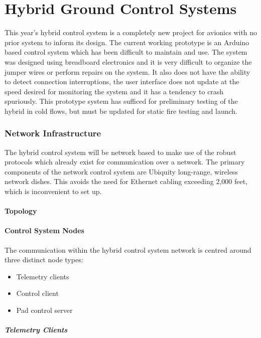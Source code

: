 \part{Hybrid Ground Control Systems}

This year's hybrid control system is a completely new project for avionics with no prior system to inform its design.
The current working prototype is an Arduino based control system which has been difficult to maintain and use. The
system was designed using breadboard electronics and it is very difficult to organize the jumper wires or perform
repairs on the system. It also does not have the ability to detect connection interruptions, the user interface does
not update at the speed desired for monitoring the system and it has a tendency to crash spuriously. This prototype
system has sufficed for preliminary testing of the hybrid in cold flows, but must be updated for static fire testing
and launch.

\section{Network Infrastructure}

The hybrid control system will be network based to make use of the robust protocols which already exist for
communication over a network. The primary components of the network control system are Ubiquity long-range, wireless
network dishes. This avoids the need for Ethernet cabling exceeding 2,000 feet, which is inconvenient to set up.

\subsection{Topology}

\subsection{Control System Nodes}

The communication within the hybrid control system network is centred around three distinct node types:

\begin{itemize}
    \item Telemetry clients
    \item Control client
    \item Pad control server
\end{itemize}

\subsubsection{Telemetry Clients}

